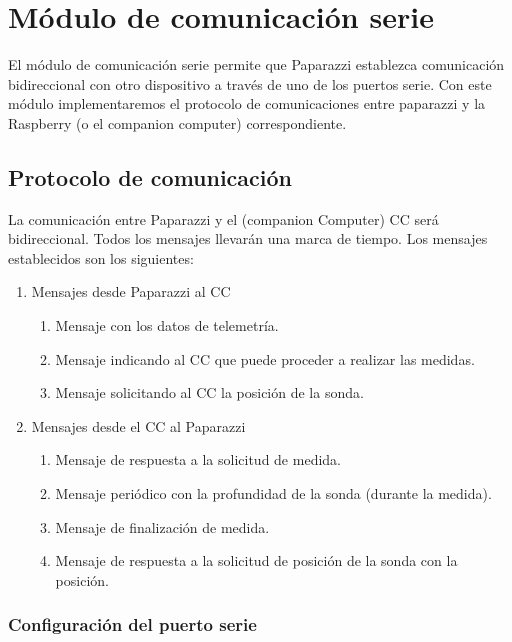 \chapter{Módulo de comunicación serie}

El módulo de comunicación serie permite que Paparazzi establezca comunicación bidireccional con otro dispositivo a través de uno de los puertos serie. Con este módulo implementaremos el protocolo de comunicaciones entre paparazzi y la Raspberry (o el companion computer) correspondiente.

\section{Protocolo de comunicación}\label{sec:1}

La comunicación entre Paparazzi y el (companion Computer) CC será bidireccional. Todos los mensajes llevarán una marca de tiempo. Los mensajes establecidos son los siguientes:
\begin{enumerate}
	\item Mensajes desde Paparazzi al CC
	\begin{enumerate}
		\item Mensaje con los datos de telemetría. 
		\item Mensaje indicando al CC que puede proceder a realizar las medidas.
		\item Mensaje solicitando al CC la posición de la sonda.
	\end{enumerate}
	\item Mensajes desde el CC al Paparazzi
	\begin{enumerate}
			\item Mensaje de respuesta a la solicitud de medida.
			\item Mensaje periódico con la profundidad de la sonda (durante la medida).
			\item Mensaje de finalización de medida.
			\item Mensaje de respuesta a la solicitud de posición de la sonda con la posición.
	\end{enumerate}	
\end{enumerate}

\subsection{Configuración del puerto serie}

